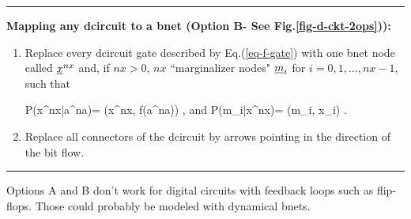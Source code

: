 \hrule\noindent
{\bf Mapping any
dcircuit to a bnet (Option B-
See Fig.\ref{fig-d-ckt-2ops})):}
\begin{enumerate}
\item
Replace every dcircuit  gate 
described by Eq.(\ref{eq-f-gate})
with
one bnet node called ${\underline{x}}^{nx}$
and, if $nx>0$, 
$nx$ ``marginalizer nodes" ${\underline{m}}_i$
for $i=0, 1, \ldots, nx-1$, such that

\beq\color{blue}
P(x^{nx}|a^{na})=
\delta(x^{nx}, f(a^{na}))
\;,
\eeq
and
\beq\color{blue}
P(m_i|x^{nx})=
\delta(m_i, x_i)
\;.
\eeq


\item
Replace
all connectors of the dcircuit
by arrows 
pointing in the direction
of the bit flow.



\end{enumerate}
\hrule 
Options A and B don't work
for digital circuits 
with feedback loops 
such as flip-flops.
Those could probably
be modeled with 
dynamical bnets.